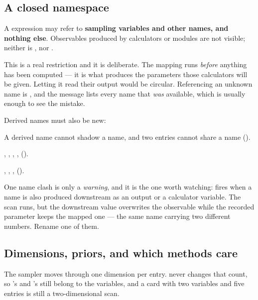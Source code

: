 \subsection{A closed namespace}
\label{sec:mapper-namespace}

A  expression may refer to \textbf{sampling variables and other
 names, and nothing else}. Observables produced by calculators or
 modules are not visible; neither is , nor .

This is a real restriction and it is deliberate. The mapping runs \emph{before} anything
has been computed --- it is what produces the parameters those calculators will be given.
Letting it read their output would be circular. Referencing an unknown name is
, and the message lists every name that \emph{was} available, which is
usually enough to see the mistake.

Derived names must also be new:

\begin{keylist}
  \item[not already taken] A derived name cannot shadow a  name, and
        two  entries cannot share a name ().
  \item[not a reserved constant] , , , , 
        ().
  \item[not a reserved column] , , ,
         ().
\end{keylist}

\begin{jwarn}
One name clash is only a \emph{warning}, and it is the one worth watching:
 fires when a  name is also produced downstream as an
 output or a calculator  variable. The scan runs, but the
downstream value overwrites the observable while the recorded parameter keeps the mapped
one --- the same name carrying two different numbers. Rename one of them.
\end{jwarn}

\subsection{Dimensions, priors, and which methods care}
\label{sec:mapper-priors}

The sampler moves through one dimension per  entry. 
never changes that count, so 's  and 's
 still belong to the variables, and a card with two variables and five
 entries is still a two-dimensional scan.

